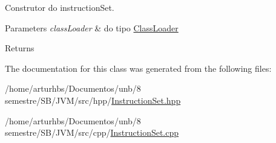 Construtor do instruction\+Set. 


\begin{DoxyParams}{Parameters}
{\em class\+Loader} & do tipo \hyperlink{classClassLoader}{Class\+Loader} \\
\hline
\end{DoxyParams}
\begin{DoxyReturn}{Returns}

\end{DoxyReturn}


The documentation for this class was generated from the following files\+:\begin{DoxyCompactItemize}
\item 
/home/arturhbs/\+Documentos/unb/8 semestre/\+S\+B/\+J\+V\+M/src/hpp/\hyperlink{InstructionSet_8hpp}{Instruction\+Set.\+hpp}\item 
/home/arturhbs/\+Documentos/unb/8 semestre/\+S\+B/\+J\+V\+M/src/cpp/\hyperlink{InstructionSet_8cpp}{Instruction\+Set.\+cpp}\end{DoxyCompactItemize}
